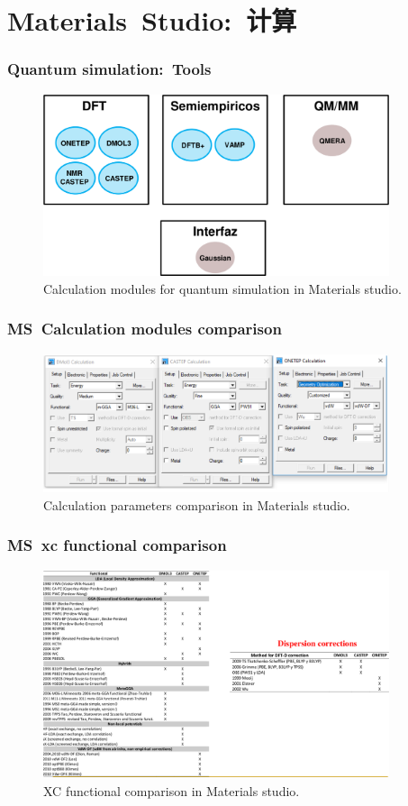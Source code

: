 \section{\rm{Materials~Studio}:~计算}
\frame
{
	\frametitle{\textrm{Quantum simulation:~Tools}}
\begin{figure}[h!]
\centering
\vspace*{-0.10in}
\includegraphics[height=2.10in,width=4.00in,viewport=0 0 1459 763,clip]{Figures/MS-Quantum_simulation-tools.png}
\caption{\tiny \textrm{Calculation modules for quantum simulation in Materials studio.}}%
\label{MS-Quantum_simulation}
\end{figure}
}

\frame
{
	\frametitle{\textrm{MS~Calculation modules comparison}}
\begin{figure}[h!]
\centering
\vspace*{-0.10in}
\includegraphics[height=1.60in,width=4.00in,viewport=0 0 1517 602,clip]{Figures/MS-Caluculator-compare-1.png}
\caption{\tiny \textrm{Calculation parameters comparison in Materials studio.}}%
\label{MS-Module_parameters}
\end{figure}
}

\frame
{
	\frametitle{\textrm{MS~xc functional  comparison}}
\begin{figure}[h!]
\centering
\vspace*{-0.15in}
\includegraphics[height=2.40in,width=4.00in,viewport=0 0 1261 751,clip]{Figures/MS-xc_functional-compare.png}
\caption{\tiny \textrm{XC functional comparison in Materials studio.}}%
\label{MS-Module_xc-functional}
\end{figure}
}

